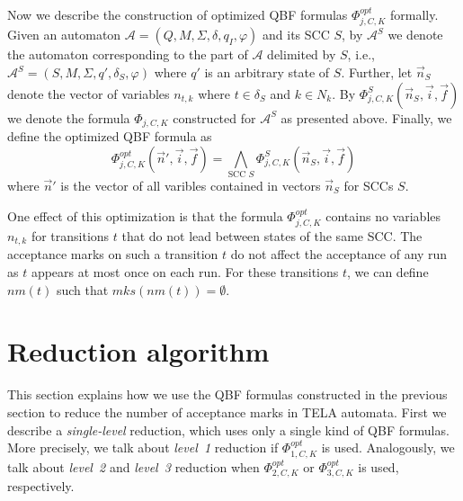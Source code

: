 \documentclass[a4paper,UKenglish,cleveref, autoref, thm-restate]{lipics-v2021}
\newcommand{\mks}{\mathit{mks}}
\newcommand{\rem}{\mathit{nm}}
\newcommand{\mA}{\mathcal{A}}
\begin{document}
Now we describe the construction of optimized QBF formulas
$\Phi^\mathit{opt}_{j,C,K}$ formally. Given an automaton
$\mA=(Q,M,\Sigma,\delta,q_I,\varphi)$ and its SCC $S$, by $\mA^S$ we
denote the automaton corresponding to the part of $\mA$ delimited by
$S$, i.e., $\mA^S=(S,M,\Sigma,q',\delta_S,\varphi)$ where $q'$ is an
arbitrary state of $S$. Further, let $\vec{n}_S$ denote the vector of
variables $n_{t,k}$ where $t\in\delta_S$ and $k\in N_k$. By
$\Phi^S_{j,C,K}(\vec{n}_S,\vec{i},\vec{f})$ we denote the formula
$\Phi_{j,C,K}$ constructed for $\mA^S$ as presented above.
Finally, we define the optimized QBF formula as
\[
  \Phi^\mathit{opt}_{j,C,K}(\vec{n}',\vec{i},\vec{f})=\bigwedge_{\textrm{SCC }S}\Phi^S_{j,C,K}(\vec{n}_S,\vec{i},\vec{f})
\]
where $\vec{n}'$ is the vector of all varibles contained in vectors
$\vec{n}_S$ for SCCs $S$.

One effect of this optimization is that the formula
$\Phi^\mathit{opt}_{j,C,K}$ contains no variables $n_{t,k}$ %
for transitions $t$ that do not lead between states of the same SCC.
The acceptance marks on such a transition $t$ do not affect the
acceptance of any run as $t$ appears at most once on each run. For
these transitions $t$, we can define $\rem(t)$ such that
$\mks(\rem(t))=\emptyset$.


\section{Reduction algorithm}\label{sec:algo}

This section explains how we use the QBF formulas constructed in the
previous section to reduce the number of acceptance marks in TELA
automata. First we describe a \emph{single-level} reduction, which
uses only a single kind of QBF formulas. More precisely, we talk about
\emph{level~1} reduction if $\Phi^\mathit{opt}_{1,C,K}$ is
used. Analogously, we talk about \emph{level~2} and \emph{level~3}
reduction when $\Phi^\mathit{opt}_{2,C,K}$ or
$\Phi^\mathit{opt}_{3,C,K}$ is used, respectively.
\end{document}
